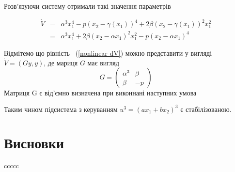 \documentclass{article}
\begin{document}
Розв'язуючи  систему отримали такі значення параметрів 

\begin{eqnarray}\label{nonlinear dV}
    \dot V &=& \alpha^3x_{1}^4 - p(x_2-\gamma(x_1))^4
    +2\beta(x_2-\gamma(x_1))^2x_{1}^2\nonumber\\ 
    &=&\alpha^3x_{1}^4 + 2\beta(x_2-\alpha x_1)^2x_{1}^2
    -p(x_2-\alpha x_1)^4
\end{eqnarray}

Відмітемо що рівність ~(\ref{nonlinear dV}) можно представити у вигляді $\dot V =(Gy,y)$, де 
мариця $G$ має вигляд 
\begin{equation}
G=\left(\begin{array}{clr}
    \alpha^3 & \beta\\
    \beta & -p
\end{array}\right) 
\end{equation}
Матриця G є від'ємно визначена при виконнані наступних умова

Таким чином підсистема з керуванням  $u^3=(ax_1+bx_2)^3$ 
є стабілізованою. 

\pagebreak
\section{Висновки}


\pagebreak
\begin{thebibliography}{}
     ccccc\\
\end{thebibliography}
\end{document}
